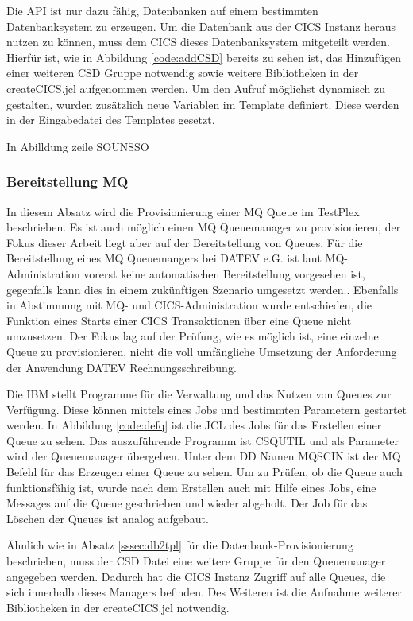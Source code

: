 Die API ist nur dazu fähig, Datenbanken auf einem bestimmten Datenbanksystem zu erzeugen.
Um die Datenbank aus der CICS Instanz heraus nutzen zu können, muss dem CICS dieses Datenbanksystem mitgeteilt werden.
Hierfür ist, wie in Abbildung \ref{code:addCSD} bereits zu sehen ist, das Hinzufügen einer weiteren CSD Gruppe notwendig sowie weitere Bibliotheken in der \glqq createCICS.jcl\grqq{} aufgenommen werden.
Um den Aufruf möglichst dynamisch zu gestalten,  wurden zusätzlich neue Variablen im Template definiert.
Diese werden in der Eingabedatei des Templates gesetzt.

In Abilldung zeile SOUNSSO

\subsubsection{Bereitstellung MQ}\label{sssec:mqtplx}
In diesem Absatz wird die Provisionierung einer MQ Queue im TestPlex beschrieben. 
Es ist auch möglich einen MQ Queuemanager zu provisionieren, der Fokus dieser Arbeit liegt aber auf der Bereitstellung von Queues. 
Für die Bereitstellung eines MQ Queuemangers bei DATEV e.G. ist laut MQ-Administration vorerst keine automatischen Bereitstellung vorgesehen ist, gegenfalls kann dies in einem zukünftigen Szenario umgesetzt werden..
Ebenfalls in Abstimmung mit MQ- und CICS-Administration wurde entschieden, die Funktion eines Starts einer CICS Transaktionen über eine Queue nicht umzusetzen. Der Fokus lag auf der Prüfung, wie es möglich ist, eine einzelne Queue zu provisionieren, nicht die voll umfängliche Umsetzung der Anforderung der Anwendung DATEV Rechnungsschreibung. 

Die IBM stellt Programme für die Verwaltung und das Nutzen von Queues  zur Verfügung.
Diese können mittels eines Jobs und bestimmten Parametern gestartet werden.
In Abbildung \ref{code:defq} ist die JCL des Jobs für das Erstellen einer Queue zu sehen.
Das auszuführende Programm ist \glqq CSQUTIL\grqq{} und als Parameter wird der Queuemanager übergeben.
Unter dem DD Namen \glqq MQSCIN\grqq{} ist der MQ Befehl für das Erzeugen einer Queue zu sehen.
Um zu Prüfen, ob die Queue auch funktionsfähig ist, wurde nach dem Erstellen auch mit Hilfe eines Jobs, eine Messages auf die Queue geschrieben und wieder abgeholt.
Der Job für das Löschen der Queues ist analog aufgebaut.

Ähnlich wie in Absatz \ref{sssec:db2tpl} für die Datenbank-Provisionierung beschrieben, muss der CSD Datei eine weitere Gruppe für den Queuemanager angegeben werden.
Dadurch hat die CICS Instanz Zugriff auf alle Queues, die sich innerhalb dieses Managers befinden.
Des Weiteren ist die Aufnahme weiterer Bibliotheken in der \glqq createCICS.jcl\grqq{} notwendig.


